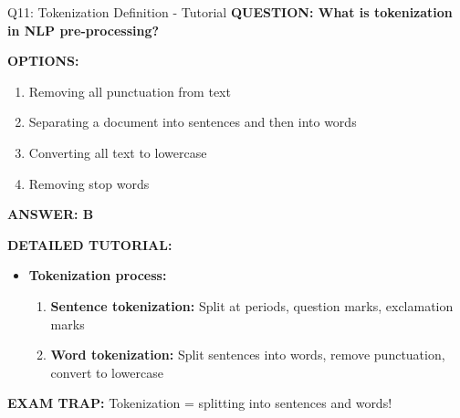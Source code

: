 \documentclass[8pt]{beamer}
\begin{document}
	\begin{frame}{Q11: Tokenization Definition - Tutorial}
		\fontsize{6.5}{7.5}\selectfont
		\textbf{QUESTION: What is tokenization in NLP pre-processing?}
		
		\vspace{0.1cm}
		\textbf{OPTIONS:}
		\begin{enumerate}
			\item Removing all punctuation from text
			\item Separating a document into sentences and then into words
			\item Converting all text to lowercase
			\item Removing stop words
		\end{enumerate}
		
		\vspace{0.1cm}
		\textcolor{myblue}{\textbf{ANSWER: B}}
		
		\vspace{0.1cm}
		\textbf{DETAILED TUTORIAL:}
		\begin{itemize}
			\item \textbf{Tokenization process:}
			\begin{enumerate}
				\item \textbf{Sentence tokenization:} Split at periods, question marks, exclamation marks
				\item \textbf{Word tokenization:} Split sentences into words, remove punctuation, convert to lowercase
			\end{enumerate}
		\end{itemize}
		
		\textcolor{myred}{\textbf{EXAM TRAP:}} Tokenization = \textcolor{myblue}{splitting into sentences and words}!
	\end{frame}
	
\end{document}

